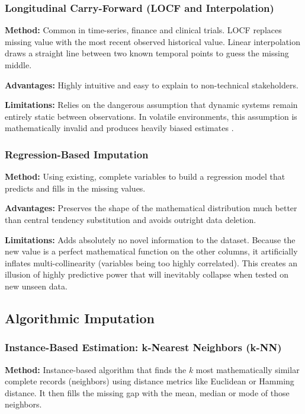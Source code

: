 \documentclass[journal]{IEEEtran}
\begin{document}
\subsubsection{Longitudinal Carry-Forward (LOCF and Interpolation)}

\noindent \textbf{Method:} Common in time-series, finance and clinical trials. LOCF replaces missing value with the most recent observed historical value. Linear interpolation draws a straight line between two known temporal points to guess the missing middle.

\noindent \textbf{Advantages:} Highly intuitive and easy to explain to non-technical stakeholders.

\noindent \textbf{Limitations:} Relies on the dangerous assumption that dynamic systems remain entirely static between observations. In volatile environments, this assumption is mathematically invalid and produces heavily biased estimates \cite{kang2013prevention}.

\subsubsection{Regression-Based Imputation}

\noindent \textbf{Method:} Using existing, complete variables to build a regression model that predicts and fills in the missing values.

\noindent \textbf{Advantages:} Preserves the shape of the mathematical distribution much better than central tendency substitution and avoids outright data deletion.

\noindent \textbf{Limitations:} Adds absolutely no novel information to the dataset. Because the new value is a perfect mathematical function on the other columns, it artificially inflates multi-collinearity (variables being too highly correlated). This creates an illusion of highly predictive power that will inevitably collapse when tested on new unseen data.

\subsection{Algorithmic Imputation}

\subsubsection{Instance-Based Estimation: k-Nearest Neighbors (k-NN)}

\noindent \textbf{Method:} Instance-based algorithm that finds the $k$ most mathematically similar complete records (neighbors) using distance metrics like Euclidean or Hamming distance. It then fills the missing gap with the mean, median or mode of those neighbors.
\end{document}
